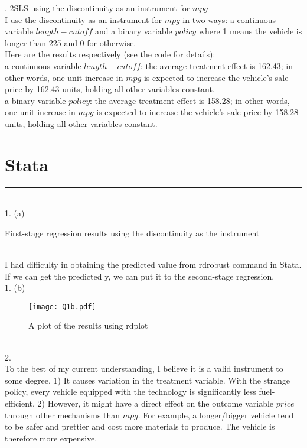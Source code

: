 \documentclass{article}
\begin{document}
. 2SLS using the discontinuity as an instrument for $mpg$
\\ I use the discontinuity as an instrument for $mpg$ in two ways: a continuous variable $length - cutoff$ and a binary variable $policy$ where 1 means the vehicle is longer than 225 and 0 for otherwise.
\smallskip
\\ Here are the results respectively (see the code for details): 
\\ a continuous variable $length - cutoff$: the average treatment effect is 162.43; in other words, one unit increase in $mpg$ is expected to increase the vehicle's sale price by 162.43 units, holding all other variables constant.
\\ a binary variable $policy$: the average treatment effect is 158.28; in other words, one unit increase in $mpg$ is expected to increase the vehicle's sale price by 158.28 units, holding all other variables constant.

\section{Stata}
\rule{17cm}{0.4pt}
\smallskip
\\ 1. (a)
\begin{table}[H]
    \centering
    
    \caption{First-stage regression results using the discontinuity as the instrument}
    \label{tab:Q1a}
\end{table}
\noindent
\\ I had difficulty in obtaining the predicted value from rdrobust command in Stata. If we can get the predicted y, we can put it to the second-stage regression. 
\bigskip
\noindent
\\ 1. (b)
\begin{figure}[H]
    \centering
    \texttt{[image: Q1b.pdf]}
    \caption{A plot of the results using rdplot}
    \label{fig:Q1b}
\end{figure}
\bigskip
\noindent
\\ 2.
\\ To the best of my current understanding, I believe it is a valid instrument to some degree. 1) It causes variation in the treatment variable. With the strange policy, every vehicle equipped with the technology is significantly less fuel-efficient. 2) However, it might have a direct effect on the outcome variable $price$ through other mechanisms than $mpg$. For example, a longer/bigger vehicle tend to be safer and prettier and cost more materials to produce. The vehicle is therefore more expensive.  
\end{document}
